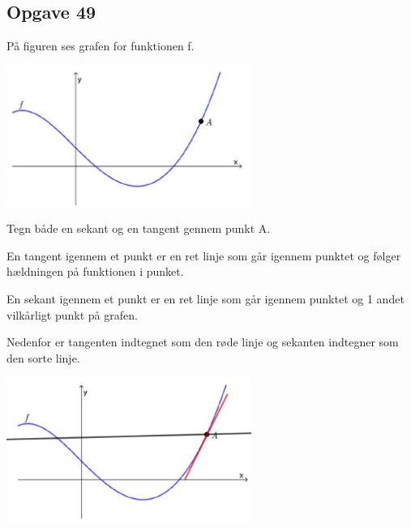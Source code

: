 \subsection{Opgave 49}

På figuren ses grafen for funktionen f.

\includegraphics[width=8cm]{Opgave_41-50/Opgave_49/49.png}

Tegn både en sekant og en tangent gennem punkt A.

\ans

En tangent igennem et punkt er en ret linje som går igennem punktet og følger hældningen på funktionen i punket.

En sekant igennem et punkt er en ret linje som går igennem punktet og 1 andet vilkårligt punkt på grafen.

Nedenfor er tangenten indtegnet som den røde linje og sekanten indtegner som den sorte linje.

\includegraphics[width=8cm]{Opgave_41-50/Opgave_49/49.1.png}

